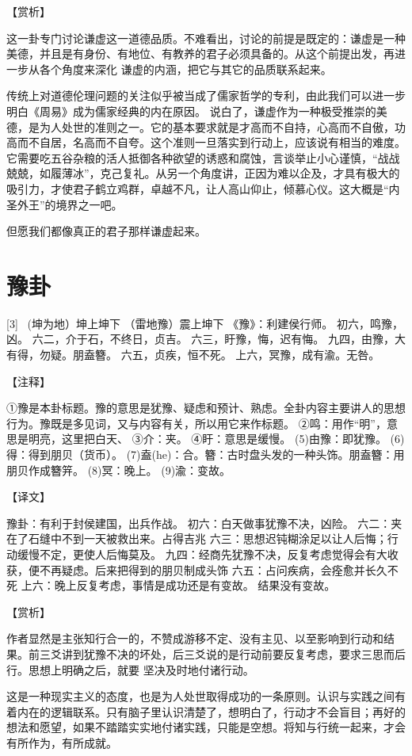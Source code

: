\documentclass[12pt,UTF8]{ctexbook}
\begin{document}
【赏析】

这一卦专门讨论谦虚这一道德品质。不难看出，讨论的前提是既定的：谦虚是一种美德，并且是有身份、有地位、有教养的君子必须具备的。从这个前提出发，再进一步从各个角度来深化 谦虚的内涵，把它与其它的品质联系起来。

传统上对道德伦理问题的关注似乎被当成了儒家哲学的专利，由此我们可以进一步明白《周易》成为儒家经典的内在原因。 说白了，谦虚作为一种极受推崇的美德，是为人处世的准则之一。它的基本要求就是才高而不自持，心高而不自傲，功高而不自居，名高而不自夸。这个准则一旦落实到行动上，应该说有相当的难度。它需要吃五谷杂粮的活人抵御各种欲望的诱惑和腐蚀，言谈举止小心谨慎，“战战兢兢，如履薄冰”，克己复礼。从另一个角度讲，正因为难以企及，才具有极大的吸引力，才使君子鹤立鸡群，卓越不凡，让人高山仰止，倾慕心仪。这大概是“内圣外王”的境界之一吧。

但愿我们都像真正的君子那样谦虚起来。


\chapter{豫卦}
[3] \ (坤为地）坤上坤下
（雷地豫）震上坤下
《豫》：利建侯行师。
初六，鸣豫，凶。
六二，介于石，不终日，贞吉。
六三，盱豫，悔，迟有悔。
九四，由豫，大有得，勿疑。朋盍簪。
六五，贞疾，恒不死。
上六，冥豫，成有渝。无咎。

【注释】

①豫是本卦标题。豫的意思是犹豫、疑虑和预计、熟虑。全卦内容主要讲人的思想行为。豫既是多见词，又与内容有关，所以用它来作标题。
②鸣：用作“明”，意思是明亮，这里把白天、
③介：夹。
④盱：意思是缓慢。
(5)由豫：即犹豫。
(6)得：得到朋贝（货币）。
(7)盍(he)：合。簪：古时盘头发的一种头饰。朋盍簪：用朋贝作成簪笄。
(8)冥：晚上。
(9)渝：变故。

【译文】

豫卦：有利于封侯建国，出兵作战。
初六：白天做事犹豫不决，凶险。
六二：夹在了石缝中不到一天被救出来。占得吉兆
六三：思想迟钝糊涂足以让人后悔；行动缓慢不定，更使人后悔莫及。
九四：经商先犹豫不决，反复考虑觉得会有大收获，便不再疑虑。后来把得到的朋贝制成头饰
六五：占问疾病，会痊愈并长久不死
上六：晚上反复考虑，事情是成功还是有变故。 结果没有变故。

【赏析】

作者显然是主张知行合一的，不赞成游移不定、没有主见、以至影响到行动和结果。前三爻讲到犹豫不决的坏处，后三爻说的是行动前要反复考虑，要求三思而后行。思想上明确之后，就要 坚决及时地付诸行动。

这是一种现实主义的态度，也是为人处世取得成功的一条原则。认识与实践之间有着内在的逻辑联系。只有脑子里认识清楚了，想明白了，行动才不会盲目；再好的想法和愿望，如果不踏踏实实地付诸实践，只能是空想。将知与行统一起来，才会有所作为，有所成就。
\end{document}
